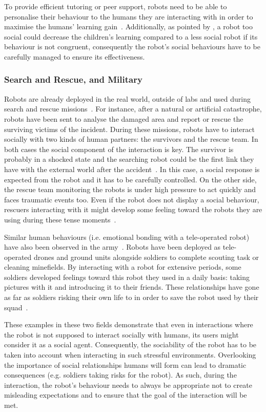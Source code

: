 To provide efficient tutoring or peer support, robots need to be able to personalise their behaviour to the humans they are interacting with in order to maximise the humans' learning gain~\citep{leyzberg2014personalizing}. Additionally, as pointed by \citet{kennedy2015robot}, a robot too social could decrease the children's learning compared to a less social robot if its behaviour is not congruent, consequently the robot's social behaviours have to be carefully managed to ensure its effectiveness. 

\subsubsection{Search and Rescue, and Military} 

Robots are already deployed in the real world, outside of labs and used during search and rescue missions~\citep{casper2003human,murphy2004human}. For instance, after a natural or artificial catastrophe, robots have been sent to analyse the damaged area and report or rescue the surviving victims of the incident. During these missions, robots have to interact socially with two kinds of human partners: the survivors and the rescue team. In both cases the social component of the interaction is key. The survivor is probably in a shocked state and the searching robot could be the first link they have with the external world after the accident~\citep{murphy2008search}. In this case, a social response is expected from the robot and it has to be carefully controlled. On the other side, the rescue team monitoring the robots is under high pressure to act quickly and faces traumatic events too. Even if the robot does not display a social behaviour, rescuers interacting with it might develop some feeling toward the robots they are using during these tense moments~\citep{fincannon2004evidence}.

Similar human behaviours (i.e. emotional bonding with a tele-operated robot) have also been observed in the army~\citep{singer2009wired}. Robots have been deployed as tele-operated drones and ground units alongside soldiers to complete scouting task or cleaning minefields. By interacting with a robot for extensive periods, some soldiers developed feelings toward this robot they used in a daily basis: taking pictures with it and introducing it to their friends. These relationships have gone as far as soldiers risking their own life to in order to save the robot used by their squad~\citep{singer2009wired}. 

These examples in these two fields demonstrate that even in interactions where the robot is not supposed to interact socially with humans, its users might consider it as a social agent. Consequently, the sociability of the robot has to be taken into account when interacting in such stressful environments. Overlooking the importance of social relationships humans will form can lead to dramatic consequences (e.g. soldiers taking risks for the robot). As such, during the interaction, the robot's behaviour needs to always be appropriate not to create misleading expectations and to ensure that the goal of the interaction will be met.
	
